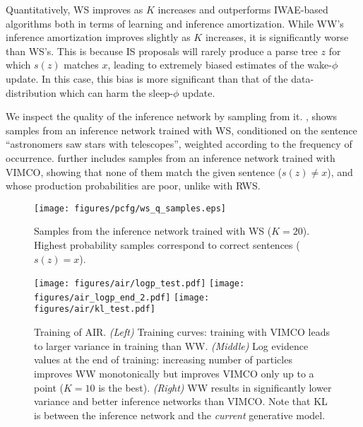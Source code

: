 Quantitatively, \gls{WS} improves as $K$ increases and outperforms \gls{IWAE}-based algorithms both in terms of learning and inference amortization.
While \gls{WW}'s inference amortization improves slightly as $K$ increases, it is significantly worse than \gls{WS}'s.
This is because \gls{IS} proposals will rarely produce a parse tree $z$ for which $s(z)$ matches $x$, leading to extremely biased estimates of the wake-$\phi$ update.
In this case, this bias is more significant than that of the data-distribution which can harm the sleep-$\phi$ update.

%
We inspect the quality of the inference network by sampling from it.
%
, shows samples from an inference network trained with \gls{WS}, conditioned on the sentence ``astronomers saw stars with telescopes'', weighted according to the frequency of occurrence.
%
 further includes samples from an inference network trained with \gls{VIMCO}, showing that none of them match the given sentence ($s(z) \neq x$), and whose production probabilities are poor, unlike with \gls{RWS}.

\begin{figure}[t]
  \centering
  \texttt{[image: figures/pcfg/ws\_q\_samples.eps]}
  \caption{
    Samples from the inference network trained with \gls{WS} ($K = 20$).
    Highest probability samples correspond to correct sentences ($s(z) = x$).
  }
  \label{fig:experiments/pcfg/ws_q_samples}
  \vspace*{-2ex}
\end{figure}



\begin{figure*}[!ht]
  \texttt{[image: figures/air/logp\_test.pdf]}
  \texttt{[image: figures/air\_logp\_end\_2.pdf]}
  \texttt{[image: figures/air/kl\_test.pdf]}
  \caption{
    Training of \gls{AIR}.
    \emph{(Left)}
    Training curves:
    training with \gls{VIMCO} leads to larger variance in training than \gls{WW}.
    \emph{(Middle)}
    Log evidence values at the end of training:
    increasing number of particles improves \gls{WW} monotonically but improves \gls{VIMCO} only up to a point ($K = 10$ is the best).
    \emph{(Right)}
    \gls{WW} results in significantly lower variance and better inference networks than \gls{VIMCO}.
    Note that \gls{KL} is between the inference network and the \emph{current} generative model.
  }
  \label{fig:air_logp}
  \vspace*{-2ex}
\end{figure*}

